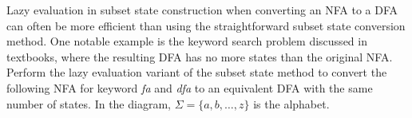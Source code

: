 \documentclass[10pt]{homework}
\begin{document}

\begin{problem}
  Lazy evaluation in subset state construction when converting an NFA to a DFA
  can often be more efficient than using the straightforward subset state
  conversion method.
  One notable example is the keyword search problem discussed in textbooks,
  where the resulting DFA has no more states than the original NFA\@.
  Perform the lazy evaluation variant of the subset state method to convert the
  following NFA for keyword \textit{fa} and \textit{dfa} to an equivalent DFA
  with the same number of states.
  In the diagram, $\Sigma = \{a,b,\ldots, z\}$ is the alphabet.

  \begin{center}
  \end{center}
\end{problem}
\end{document}
